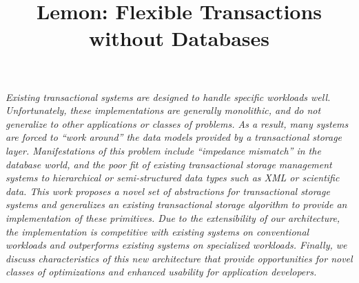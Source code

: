 \documentclass[10pt,letterpaper,twocolumn,english]{article}
\newcommand{\yad}{Lemon\xspace}
\begin{document}
\title{\vspace*{-36pt}\yad: Flexible Transactions without Databases\vspace*{-36pt}}

\maketitle




{\em Existing transactional systems are designed to handle specific
workloads well.  Unfortunately, these implementations are generally
monolithic, and do not generalize to other applications or classes of
problems.  As a result, many systems are forced to ``work around'' the
data models provided by a transactional storage layer. Manifestations
of this problem include ``impedance mismatch'' in the database world,
and the poor fit of existing transactional storage management systems
to hierarchical or semi-structured data types such as XML or
scientific data.  This work proposes a novel set of abstractions for
transactional storage systems and generalizes an existing
transactional storage algorithm to provide an implementation of these
primitives.  Due to the extensibility of our architecture, the
implementation is competitive with existing systems on conventional
workloads and outperforms existing systems on specialized
workloads.  Finally, we discuss characteristics of this new
architecture that provide opportunities for novel classes of
optimizations and enhanced usability for application developers.}

\end{document}
